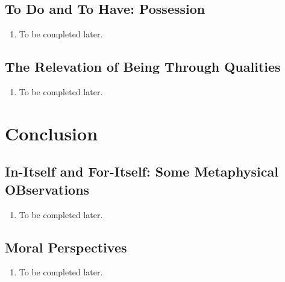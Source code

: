 \subsection{To Do and To Have: Possession}

\begin{enumerate}
  \item To be completed later.
\end{enumerate}

\subsection{The Relevation of Being Through Qualities}

\begin{enumerate}
  \item To be completed later.
\end{enumerate}

\section{Conclusion}

\subsection{In-Itself and For-Itself: Some Metaphysical OBservations}

\begin{enumerate}
  \item To be completed later.
\end{enumerate}

\subsection{Moral Perspectives}

\begin{enumerate}
  \item To be completed later.
\end{enumerate}
